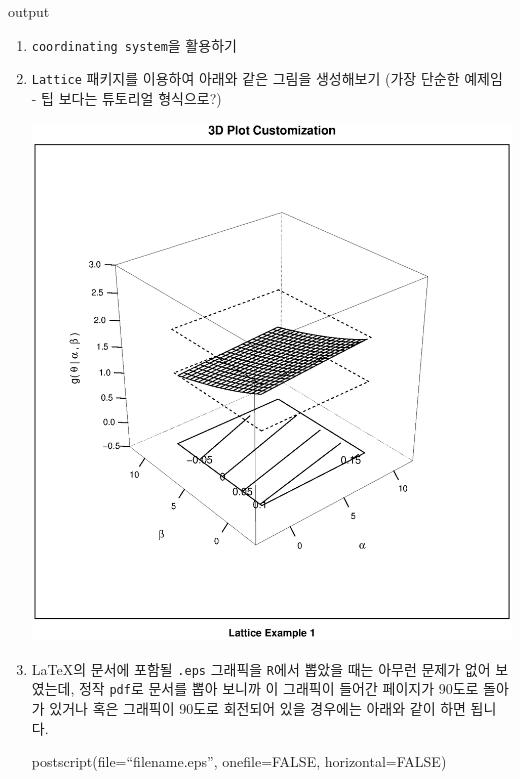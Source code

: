 \documentclass{report}
\begin{document}
\begin{Schunk}
\begin{Soutput}
output
\end{Soutput}
\end{Schunk}

\begin{enumerate}

\item \texttt{coordinating system}을 활용하기

\item \texttt{Lattice} 패키지를 이용하여 아래와 같은 그림을 생성해보기 (가장 단순한 예제임 - 팁 보다는 튜토리얼 형식으로?)

\includegraphics{./img/lattice-fig.eps}


\item \LaTeX 의 문서에 포함될 \texttt{.eps} 그래픽을 \texttt{R}에서 뽑았을 때는 아무런 문제가 없어 보였는데, 정작 \texttt{pdf}로 문서를 뽑아 보니까 이 그래픽이 들어간 페이지가 90도로 돌아가 있거나 혹은 그래픽이 90도로 회전되어 있을 경우에는 아래와 같이 하면 됩니다.

\begin{Schunk}
 \begin{Sinput}
  postscript(file=``filename.eps'', onefile=FALSE, horizontal=FALSE)
 \end{Sinput}
\end{Schunk}


\end{enumerate}
\end{document}
